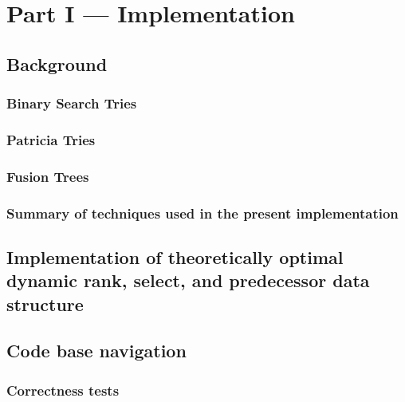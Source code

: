 \chapter{Part I --- Implementation}

\section{Background}

\subsection{Binary Search Tries}

\subsection{Patricia Tries}

\subsection{Fusion Trees}

\subsection{Summary of techniques used in the present implementation}

\section{Implementation of theoretically optimal dynamic rank, select, and predecessor data structure}

\section{Code base navigation}

\subsection{Correctness tests}